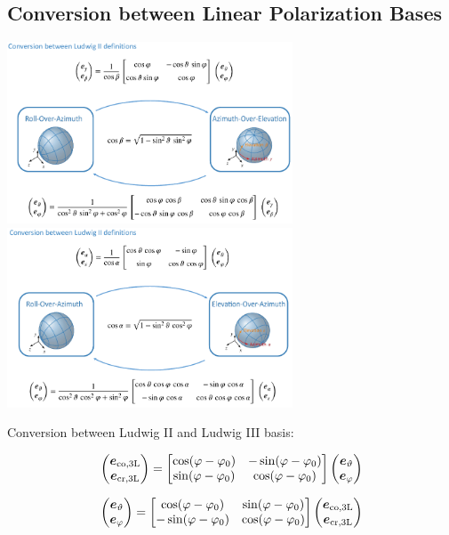 \subsection{Conversion between Linear Polarization Bases}


\includegraphics[width=8.5cm]{content/at_meas/pictures/ludwig_II_conversion1}
\includegraphics[width=8.5cm]{content/at_meas/pictures/ludwig_II_conversion2}

Conversion between Ludwig II and Ludwig III basis:

\begin{equation*}
  \begin{pmatrix}
    \boldsymbol{e}_{\text{co,3L}}\\
    \boldsymbol{e}_{\text{cr,3L}}
  \end{pmatrix}
  =
  \begin{bmatrix}
    \cos(\varphi - \varphi_{0}) & - \sin(\varphi - \varphi_{0})\\
    \sin(\varphi - \varphi_{0}) & \cos(\varphi - \varphi_{0})
  \end{bmatrix}
  \begin{pmatrix}
    \boldsymbol{e}_{\vartheta}\\
    \boldsymbol{e}_{\varphi}
  \end{pmatrix}
\end{equation*}

\begin{equation*}
  \begin{pmatrix}
    \boldsymbol{e}_{\vartheta}\\
    \boldsymbol{e}_{\varphi}
  \end{pmatrix}
  =
  \begin{bmatrix}
    \cos(\varphi - \varphi_{0}) & \sin(\varphi - \varphi_{0})\\
    - \sin(\varphi - \varphi_{0}) & \cos(\varphi - \varphi_{0})
  \end{bmatrix}
  \begin{pmatrix}
    \boldsymbol{e}_{\text{co,3L}}\\
    \boldsymbol{e}_{\text{cr,3L}}
  \end{pmatrix}
\end{equation*}

